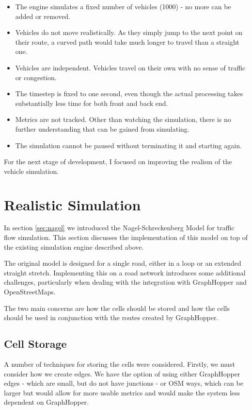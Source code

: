 \documentclass[ %
                    author={Alexander Hill},
                supervisor={Dr. Benjamin Sach},
                    degree={MEng},
                     title={MARMOSET},
                  subtitle={Multi-Agent Route Management using Online Simulation for Efficient Transportation},
                      type={research},
                      year={2016} ]{dissertation}
\begin{document}
\begin{itemize}
    \item The engine simulates a fixed number of vehicles (1000) - no more can
        be added or removed.
    \item Vehicles do not move realistically. As they simply jump to the next
        point on their route, a curved path would take much longer to travel
        than a straight one.
    \item Vehicles are independent. Vehicles travel on their own with no sense
        of traffic or congestion.
    \item The timestep is fixed to one second, even though the actual processing
        takes substantially less time for both front and back end.
    \item Metrics are not tracked. Other than watching the simulation, there is
        no further understanding that can be gained from simulating.
    \item The simulation cannot be paused without terminating it and starting
        again.
\end{itemize}

For the next stage of development, I focused on improving the realism of the
vehicle simulation.

\section{Realistic Simulation}

In section \ref{sec:nagel} we introduced the Nagel-Schreckenberg Model for
traffic flow simulation. This section discusses the implementation of this model
on top of the existing simulation engine described above.

The original model is designed for a single road, either in a loop or an
extended straight stretch. Implementing this on a road network introduces some
additional challenges, particularly when dealing with the integration with
GraphHopper and OpenStreetMaps.

The two main concerns are how the cells should be stored and how the cells
should be used in conjunction with the routes created by GraphHopper.

\subsection{Cell Storage}

A number of techniques for storing the cells were considered. Firstly, we must
consider how we create edges. We have the option of using either GraphHopper
edges - which are small, but do not have junctions - or OSM ways, which can be
larger but would allow for more usable metrics and would make the system less
dependent on GraphHopper.
\end{document}
